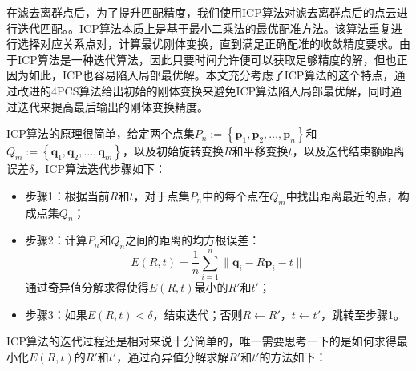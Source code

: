 在滤去离群点后，为了提升匹配精度，我们使用ICP算法对滤去离群点后的点云进行迭代匹配。。ICP算法本质上是基于最小二乘法的最优配准方法。该算法重复进行选择对应关系点对，计算最优刚体变换，直到满足正确配准的收敛精度要求。由于ICP算法是一种迭代算法，因此只要时间允许便可以获取足够精度的解，但也正因为如此，ICP也容易陷入局部最优解。本文充分考虑了ICP算法的这个特点，通过改进的4PCS算法给出初始的刚体变换来避免ICP算法陷入局部最优解，同时通过迭代来提高最后输出的刚体变换精度。

ICP算法的原理很简单，给定两个点集$P_n:=\left\{\mathbf{p}_1,\mathbf{p}_2,\ldots,\mathbf{p}_n\right\}$和$Q_m:=\left\{\mathbf{q}_1,\mathbf{q}_2,\ldots,\mathbf{q}_m\right\}$，以及初始旋转变换$R$和平移变换$t$，以及迭代结束额距离误差$\delta$，ICP算法迭代步骤如下：
\begin{itemize}
\item {\kai 步骤1：}根据当前$R$和$t$，对于点集$P_n$中的每个点在$Q_m$中找出距离最近的点，构成点集$Q_n$；
\item {\kai 步骤2：}计算$P_n$和$Q_n$之间的距离的均方根误差：
  \begin{equation}
    E(R,t) = \frac{1}{n}\sum_{i=1}^n{\parallel \mathbf{q}_i - R\mathbf{p}_i - t\parallel}
  \end{equation}
  通过奇异值分解求得使得$E(R,t)$最小的$R'$和$t'$；
\item {\kai 步骤3：}如果$E(R,t) < \delta$，结束迭代；否则$R\leftarrow R'$，$t\leftarrow t'$，跳转至步骤1。
\end{itemize}

ICP算法的迭代过程还是相对来说十分简单的，唯一需要思考一下的是如何求得最小化$E(R,t)$的$R'$和$t'$，通过奇异值分解求解$R'$和$t'$的方法如下：

